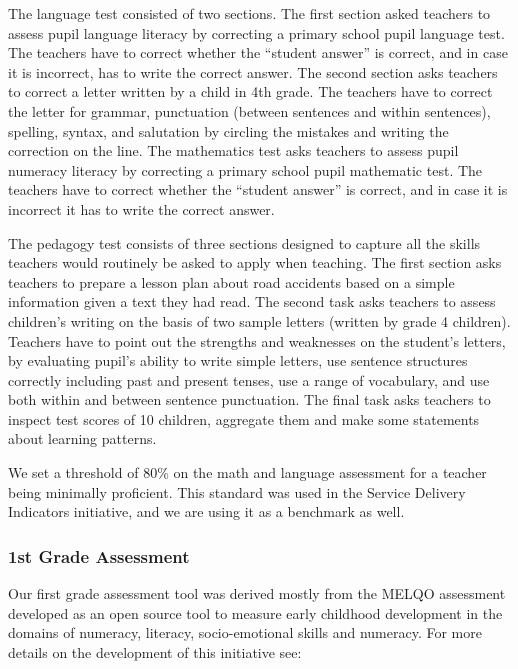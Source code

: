 \documentclass[]{article}
\begin{document}
The language test consisted of two sections. The first section asked
teachers to assess pupil language literacy by correcting a primary
school pupil language test. The teachers have to correct whether the
``student answer'' is correct, and in case it is incorrect, has to write
the correct answer. The second section asks teachers to correct a letter
written by a child in 4th grade. The teachers have to correct the letter
for grammar, punctuation (between sentences and within sentences),
spelling, syntax, and salutation by circling the mistakes and writing
the correction on the line. The mathematics test asks teachers to assess
pupil numeracy literacy by correcting a primary school pupil mathematic
test. The teachers have to correct whether the ``student answer'' is
correct, and in case it is incorrect it has to write the correct answer.

The pedagogy test consists of three sections designed to capture all the
skills teachers would routinely be asked to apply when teaching. The
first section asks teachers to prepare a lesson plan about road
accidents based on a simple information given a text they had read. The
second task asks teachers to assess children's writing on the basis of
two sample letters (written by grade 4 children). Teachers have to point
out the strengths and weaknesses on the student's letters, by evaluating
pupil's ability to write simple letters, use sentence structures
correctly including past and present tenses, use a range of vocabulary,
and use both within and between sentence punctuation. The final task
asks teachers to inspect test scores of 10 children, aggregate them and
make some statements about learning patterns.

We set a threshold of 80\% on the math and language assessment for a
teacher being minimally proficient. This standard was used in the
Service Delivery Indicators initiative, and we are using it as a
benchmark as well.

\hypertarget{st-grade-assessment}{%
\subsubsection{1st Grade Assessment}\label{st-grade-assessment}}

Our first grade assessment tool was derived mostly from the MELQO
assessment developed as an open source tool to measure early childhood
development in the domains of numeracy, literacy, socio-emotional skills
and numeracy. For more details on the development of this initiative
see:
\end{document}
